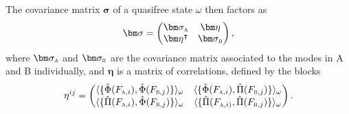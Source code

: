 \documentclass[letterpaper,12pt,titlepage,oneside,final]{book}
\newcommand{\tc}[1]{\textsc{#1}}
\begin{document}
The covariance matrix $\bm \sigma$ of a quasifree state $\omega$ then factors as
\begin{equation}
    \bm \sigma  = \begin{pmatrix}\bm \sigma_\tc{a} & \bm \eta \\ \bm \eta^\intercal & \bm \sigma_\tc{b}\end{pmatrix},
\end{equation}
where $\bm \sigma_\tc{a}$ and $\bm \sigma_\tc{b}$ are the covariance matrix associated to the modes in A and B individually, and $\bm \eta$ is a matrix of correlations, defined by the blocks
\begin{equation}
    \eta^{ij} = \begin{pmatrix}\langle \{\hat{\Phi}(F_{\tc{a},i}),\hat{\Phi}(F_{\tc{b},j})\}\rangle_\omega & \langle \{\hat{\Phi}(F_{\tc{a},i}),\hat{\Pi}(F_{\tc{b},j})\}\rangle_\omega\\
    \langle \{\hat{\Pi}(F_{\tc{a},i}),\hat{\Phi}(F_{\tc{b},j})\}\rangle_\omega & \langle \{\hat{\Pi}(F_{\tc{a},i)},\hat{\Pi}(F_{\tc{b},j})\}\rangle_\omega\end{pmatrix}.
\end{equation}
\end{document}
